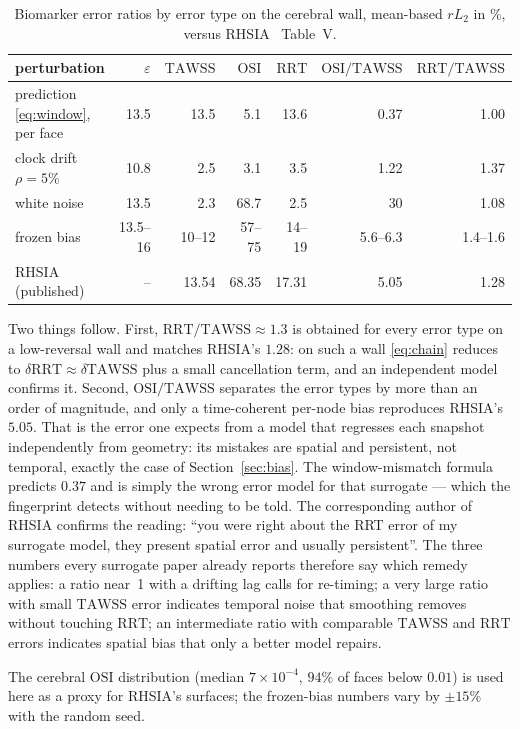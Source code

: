 \documentclass[11pt,a4paper]{article}
\newcommand{\TAWSS}{\mathrm{TAWSS}}
\newcommand{\OSI}{\mathrm{OSI}}
\newcommand{\RRT}{\mathrm{RRT}}
\newcommand{\eps}{\varepsilon}
\begin{document}
\begin{table}[t]
\centering
\caption{Biomarker error ratios by error type on the cerebral wall,
mean-based $rL_2$ in \%, versus RHSIA~\cite{rhsia2026} Table~V.}
\label{tab:fp}
\begin{tabular}{l r r r r r r}
\toprule
perturbation & $\eps$ & $\TAWSS$ & $\OSI$ & $\RRT$ & $\OSI/\TAWSS$ & $\RRT/\TAWSS$\\
\midrule
prediction \eqref{eq:window}, per face & 13.5 & 13.5 & 5.1 & 13.6 & 0.37 & 1.00\\
clock drift $\rho=5\%$ & 10.8 & 2.5 & 3.1 & 3.5 & 1.22 & 1.37\\
white noise & 13.5 & 2.3 & 68.7 & 2.5 & 30 & 1.08\\
frozen bias & 13.5--16 & 10--12 & 57--75 & 14--19 & 5.6--6.3 & 1.4--1.6\\
\midrule
RHSIA (published) & -- & 13.54 & 68.35 & 17.31 & 5.05 & 1.28\\
\bottomrule
\end{tabular}
\end{table}

Two things follow. First, $\RRT/\TAWSS\approx1.3$ is obtained for every
error type on a low-reversal wall and matches RHSIA's $1.28$: on such a wall
\eqref{eq:chain} reduces to $\delta\RRT\approx\delta\TAWSS$ plus a small
cancellation term, and an independent model confirms it. Second,
$\OSI/\TAWSS$ separates the error types by more than an order of magnitude,
and only a time-coherent per-node bias reproduces RHSIA's $5.05$. That is
the error one expects from a model that regresses each snapshot
independently from geometry: its mistakes are spatial and persistent, not
temporal, exactly the case of Section~\ref{sec:bias}. The window-mismatch
formula predicts $0.37$ and is simply the wrong error model for that
surrogate --- which the fingerprint detects without needing to be told.
The corresponding author of RHSIA confirms the reading: ``you were right
about the RRT error of my surrogate model, they present spatial error and
usually persistent''. The three numbers every surrogate
paper already reports therefore say which remedy applies: a ratio near~1
with a drifting lag calls for re-timing; a very large ratio with small
$\TAWSS$ error indicates temporal noise that smoothing removes without
touching $\RRT$; an intermediate ratio with comparable $\TAWSS$ and $\RRT$
errors indicates spatial bias that only a better model repairs.

The cerebral $\OSI$ distribution (median $7\times10^{-4}$, $94\%$ of faces
below $0.01$) is used here as a proxy for RHSIA's surfaces; the
frozen-bias numbers vary by $\pm15\%$ with the random seed.
\end{document}

